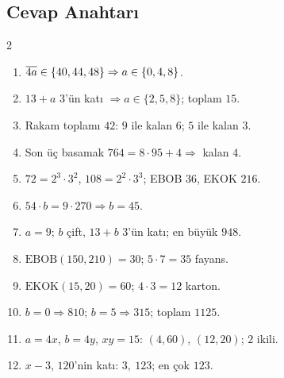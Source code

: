 \subsection*{Cevap Anahtarı}
{\small
\begin{multicols}{2}
\begin{enumerate}[label=\textbf{\arabic*.},leftmargin=*,itemsep=1pt]
\item \(\overline{4a}\in\{40,44,48\}\Rightarrow a\in\{0,4,8\}\).
\item \(13+a\) \(3\)'ün katı \(\Rightarrow a\in\{2,5,8\}\); toplam \(15\).
\item Rakam toplamı \(42\): \(9\) ile kalan \(6\); \(5\) ile kalan \(3\).
\item Son üç basamak \(764=8\cdot 95+4\Rightarrow\) kalan \(4\).
\item \(72=2^3\cdot 3^2\), \(108=2^2\cdot 3^3\); EBOB \(36\), EKOK \(216\).
\item \(54\cdot b=9\cdot 270\Rightarrow b=45\).
\item \(a=9\); \(b\) çift, \(13+b\) \(3\)'ün katı; en büyük \(948\).
\item \(\text{EBOB}(150,210)=30\); \(5\cdot 7=35\) fayans.
\item \(\text{EKOK}(15,20)=60\); \(4\cdot 3=12\) karton.
\item \(b=0\Rightarrow 810\); \(b=5\Rightarrow 315\); toplam \(1125\).
\item \(a=4x\), \(b=4y\), \(xy=15\): \((4,60)\), \((12,20)\); \(2\) ikili.
\item \(x-3\), \(120\)'nin katı: \(3,\ 123\); en çok \(123\).
\end{enumerate}
\end{multicols}}
